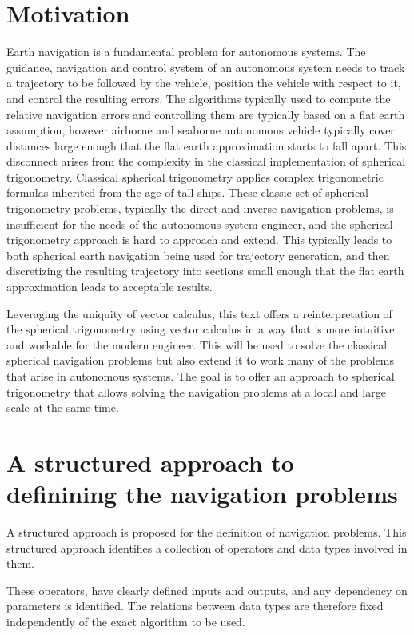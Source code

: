 \section{Motivation}
Earth navigation is a fundamental problem for autonomous systems. The guidance, navigation and control system of an autonomous system needs to track a trajectory to be followed by the vehicle, position the vehicle with respect to it, and control the resulting errors. The algorithms typically used to compute the relative navigation errors and controlling them are typically based on a flat earth assumption, however airborne and seaborne autonomous vehicle typically cover distances large enough that the flat earth approximation starts to fall apart. This disconnect arises from the complexity in the classical implementation of spherical trigonometry. Classical spherical trigonometry applies complex trigonometric formulas inherited from the age of tall ships. These classic set of spherical trigonometry problems, typically the direct and inverse navigation problems, is insufficient for the needs of the autonomous system engineer, and the spherical trigonometry approach is hard to approach and extend. This typically leads to both spherical earth navigation being used for trajectory generation, and then discretizing the resulting trajectory into sections small enough that the flat earth approximation leads to acceptable results.

Leveraging the uniquity of vector calculus, this text offers a reinterpretation of the spherical trigonometry using vector calculus in a way that is more intuitive and workable for the modern engineer. This will be used to solve the classical spherical navigation problems but also extend it to work many of the problems that arise in autonomous systems. The goal is to offer an approach to spherical trigonometry that allows solving the navigation problems at a local and large scale at the same time.

\section{A structured approach to definining the navigation problems}

A structured approach is proposed for the definition of navigation problems. This structured approach identifies a collection of operators and data types involved in them.

These operators, have clearly defined inputs and outputs, and any dependency on parameters is identified. The relations between data types are therefore fixed independently of the exact algorithm to be used.

